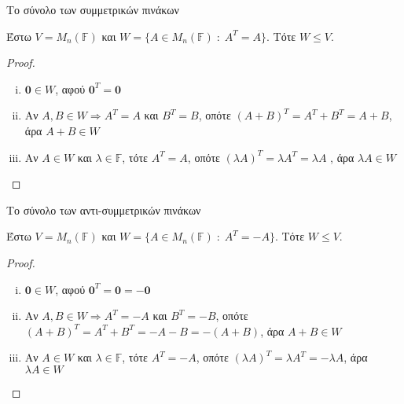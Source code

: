 \documentclass[a4paper,table]{report}
\begin{document}
\begin{example}
  \textcolor{Col2}{Το σύνολο των συμμετρικών πινάκων}

  Έστω $ V = M_{n}(\mathbb{F}) $ και $ W = \{ A \in M_{n}(\mathbb{F}) \;
  : \; A^{T}=A \}  $. Τότε $ W \leq V $.
  \begin{proof}
  \item {}
    \begin{enumerate}[i)]
      \item  $ \mathbf{0} \in W $, αφού $ \mathbf{0}^{T}= 
        \mathbf{0} $
      \item Αν $ A, B \in W \Rightarrow A^{T}=A $ και $ B^{T}=B $, 
        οπότε $ (A+B)^{T}= A^{T}+B^{T}=A+B $, άρα $A+B \in W$
      \item Αν $ A \in W $ και $ \lambda \in \mathbb{F} $, τότε 
        $A^{T}=A$, οπότε $(\lambda A)^{T} = \lambda A^{T} = 
        \lambda A  $ , άρα $ \lambda A \in W $
    \end{enumerate}
  \end{proof}
\end{example}

\begin{example}
  \textcolor{Col2}{Το σύνολο των αντι-συμμετρικών πινάκων}

  Έστω $ V = M_{n}(\mathbb{F}) $ και $ W = \{ A \in M_{n}(\mathbb{F}) \;
  : \; A^{T}=-A \}  $. Τότε $ W \leq V $.
  \begin{proof}
  \item {}
    \begin{enumerate}[i)]
      \item  $ \mathbf{0} \in W $, αφού $ \mathbf{0}^{T}= 
        \mathbf{0} = - \mathbf{0} $
      \item 
        Αν $ A, B \in W \Rightarrow A^{T}=-A $ και $ B^{T}=-B $, οπότε
        $ (A+B)^{T}= A^{T}+B^{T}=-A-B = - (A+B) $, άρα $A+B \in W$
      \item Αν $ A \in W $ και $ \lambda \in \mathbb{F} $, τότε 
        $A^{T}=-A$, οπότε $(\lambda A)^{T} = \lambda A^{T} =
        -\lambda A  $, άρα $ \lambda A \in W $
    \end{enumerate}
  \end{proof}
\end{example}
\end{document}
